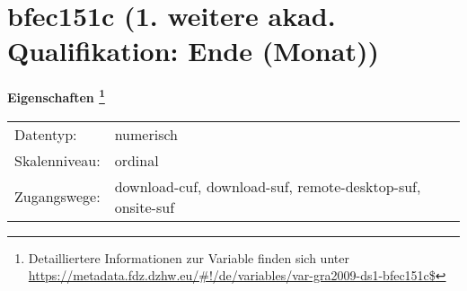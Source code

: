
    \setcounter{footnote}{0}

    \vspace*{-1.8cm}
	\section{bfec151c (1. weitere akad. Qualifikation: Ende (Monat))}
	\label{section:bfec151c}



    \vspace*{0.5cm}
    \noindent\textbf{Eigenschaften
	\footnote{Detailliertere Informationen zur Variable finden sich unter
		\url{https://metadata.fdz.dzhw.eu/\#!/de/variables/var-gra2009-ds1-bfec151c$}}}\\
	\begin{tabularx}{\hsize}{@{}lX}
	Datentyp: & numerisch \\
	Skalenniveau: & ordinal \\
	Zugangswege: &
	  download-cuf, 
	  download-suf, 
	  remote-desktop-suf, 
	  onsite-suf
 \\
    \end{tabularx}



